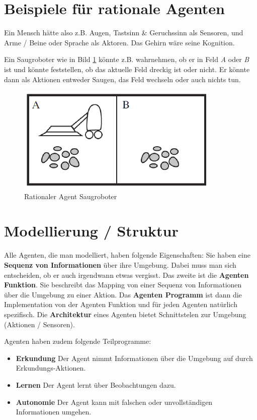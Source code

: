 \section{Beispiele für rationale Agenten}
Ein Mensch hätte also z.B. Augen, Tastsinn \& Geruchssinn als Sensoren, und Arme / Beine oder Sprache als Aktoren. Das Gehirn wäre seine Kognition.

Ein Saugroboter wie in Bild \ref{fig:saugroboter} könnte z.B. wahrnehmen, ob er in Feld \textit{A} oder \textit{B} ist und könnte feststellen, ob das aktuelle Feld dreckig ist oder nicht. Er könnte dann als Aktionen entweder Saugen, das Feld wechseln oder auch nichts tun.

\begin{figure}[h]
	\centering
	\includegraphics[width=0.7\linewidth]{fig/saugroboter}
	\caption{Rationaler Agent Saugroboter}
	\label{fig:saugroboter}
\end{figure}

\section{Modellierung / Struktur}
Alle Agenten, die man modelliert, haben folgende Eigenschaften: Sie haben eine \textbf{Sequenz von Informationen} über ihre Umgebung. Dabei muss man sich entscheiden, ob er auch irgendwann etwas vergisst. Das zweite ist die \textbf{Agenten Funktion}. Sie beschreibt das Mapping von einer Sequenz von Informationen über die Umgebung zu einer Aktion. Das \textbf{Agenten Programm} ist dann die Implementation von der Agenten Funktion und für jeden Agenten natürlich spezifisch. Die \textbf{Architektur} eines Agenten bietet Schnittstelen zur Umgebung (Aktionen / Sensoren).

Agenten haben zudem folgende Teilprogramme:
\begin{itemize}
	\item \textbf{Erkundung} Der Agent nimmt Informationen über die Umgebung auf durch Erkundungs-Aktionen.
	\item \textbf{Lernen} Der Agent lernt über Beobachtungen dazu.
	\item \textbf{Autonomie} Der Agent kann mit falschen oder unvollständigen Informationen umgehen.
\end{itemize}

